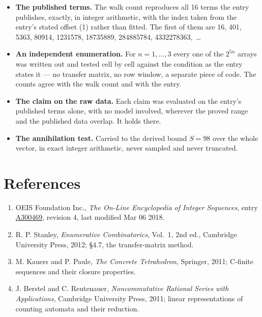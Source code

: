 \documentclass[11pt]{article}
\theoremstyle{definition}
\begin{document}
\begin{itemize}

\item {\bfseries The published terms.} The walk count reproduces all 16 terms the entry publishes, exactly, in integer arithmetic, with the index taken from the entry's stated offset (1) rather than fitted. The first of them are 16, 401, 5363, 80914, 1231578, 18735889, 284885784, 4332278363,~\dots

\item {\bfseries An independent enumeration.} For $n = 1,\dots,3$ every one of the $2^{5n}$ arrays was written out and tested cell by cell against the condition as the entry states it --- no transfer matrix, no row window, a separate piece of code. The counts agree with the walk count and with the entry.

\item {\bfseries The claim on the raw data.} Each claim was evaluated on the entry's published terms alone, with no model involved, wherever the proved range and the published data overlap. It holds there.

\item {\bfseries The annihilation test.} Carried to the derived bound $S = 98$ over the whole vector, in exact integer arithmetic, never sampled and never truncated.

\end{itemize}

\section{References}

\begin{enumerate}

\item OEIS Foundation Inc., \emph{The On-Line Encyclopedia of Integer Sequences}, entry \href{https://oeis.org/A300469}{A300469}, revision 4, last modified Mar 06 2018.

\item R. P. Stanley, \emph{Enumerative Combinatorics}, Vol.~1, 2nd ed., Cambridge University Press, 2012; \S4.7, the transfer-matrix method.

\item M. Kauers and P. Paule, \emph{The Concrete Tetrahedron}, Springer, 2011; C-finite sequences and their closure properties.

\item J. Berstel and C. Reutenauer, \emph{Noncommutative Rational Series with Applications}, Cambridge University Press, 2011; linear representations of counting automata and their reduction.

\end{enumerate}
\end{document}
